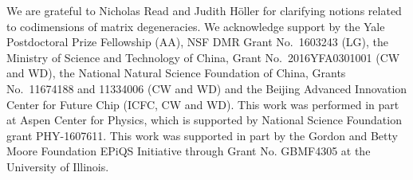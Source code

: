 \documentclass[aps, prb, showpacs, twocolumn, notitlepage, superscriptaddress]{revtex4-1}
\begin{document}




\begin{acknowledgments}

We are grateful to Nicholas Read and Judith H\"oller for clarifying notions related to codimensions of matrix degeneracies. 
We acknowledge support by  the Yale Postdoctoral Prize Fellowship (AA), NSF DMR Grant No.\ 1603243 (LG),  the Ministry of Science and Technology of China, Grant No.\ 2016YFA0301001 (CW and WD), the National Natural Science Foundation of China, Grants No.\ 11674188 and 11334006 (CW and WD) and the Beijing Advanced Innovation Center for Future Chip (ICFC, CW and WD). This work was performed in part at Aspen Center for Physics, which is supported by National Science Foundation grant PHY-1607611. This work was supported in part by the Gordon and Betty Moore Foundation EPiQS Initiative through Grant No. GBMF4305 at the University of Illinois.
\end{acknowledgments}
\end{document}

